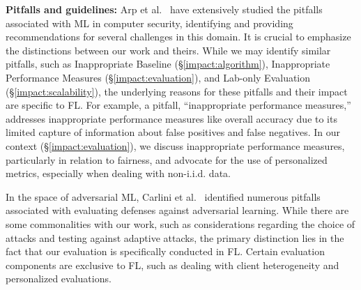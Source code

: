\noindent\textbf{Pitfalls and guidelines: }
Arp et al.~\cite{arp2022and} have extensively studied the pitfalls associated with ML in computer security, identifying and providing recommendations for several challenges in this domain. It is crucial to emphasize the distinctions between our work and theirs. While we may identify similar pitfalls, such as Inappropriate Baseline (\S\ref{impact:algorithm}), Inappropriate Performance Measures (\S\ref{impact:evaluation}), and Lab-only Evaluation (\S\ref{impact:scalability}), the underlying reasons for these pitfalls and their impact are specific to FL. 
For example, a pitfall, ``inappropriate performance measures,'' addresses inappropriate performance measures like overall accuracy due to its limited capture of information about false positives and false negatives. In our context (\S\ref{impact:evaluation}), we discuss inappropriate performance measures, particularly in relation to fairness, and advocate for the use of personalized metrics, especially when dealing with non-i.i.d. data.

In the space of adversarial ML, Carlini et al.~\cite{carlini2019evaluating} identified numerous pitfalls associated with evaluating defenses against adversarial learning. While there are some commonalities with our work, such as considerations regarding the choice of attacks and testing against adaptive attacks, the primary distinction lies in the fact that our evaluation is specifically conducted in FL. Certain evaluation components are exclusive to FL, such as dealing with client heterogeneity and personalized evaluations.

